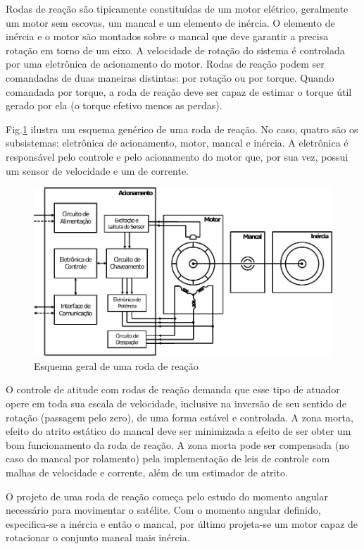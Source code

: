 Rodas de reação são tipicamente constituídas de um motor elétrico, geralmente um motor sem escovas, um mancal e um elemento de inércia.  O elemento de inércia e o motor são montados sobre o mancal que deve garantir a  precisa rotação em torno de um eixo. A velocidade de rotação do sistema é controlada por uma eletrônica de acionamento do motor. Rodas de reação podem ser comandadas de duas maneiras distintas: por rotação ou por torque. Quando comandada por torque, a roda de reação deve ser capaz de estimar o torque útil gerado por ela (o torque efetivo menos as perdas). 

Fig.\ref{fig:EsquemaRoda} ilustra um esquema genérico de uma roda de reação. No caso, quatro são os subsistemas: eletrônica de acionamento, motor, mancal e inércia. A eletrônica é responsável pelo controle e pelo acionamento do motor que, por sua vez, possui um sensor de velocidade e um de corrente. 


\begin{figure}[ht!]
\centering
\includegraphics[width=1\linewidth]{./Figs/EsquemaRoda}
\caption{Esquema geral de uma roda de reação}
\label{fig:EsquemaRoda}
\end{figure}

O controle de atitude  com rodas de reação demanda que esse tipo de  atuador opere em toda sua escala de velocidade, inclusive na inversão de seu sentido de rotação (passagem pelo zero), de uma forma estável e controlada. A zona morta, efeito do atrito estático do mancal deve ser minimizada a efeito de ser obter um bom funcionamento da roda de reação. A zona morta pode ser compensada (no caso do mancal por rolamento) pela implementação de leis de controle com malhas de velocidade e corrente, além de um estimador de atrito.

O projeto de uma roda de reação começa pelo estudo do momento angular necessário para movimentar o satélite. Com o momento angular definido, especifica-se a inércia e então o mancal, por último projeta-se um motor capaz de rotacionar o conjunto mancal mais inércia.

